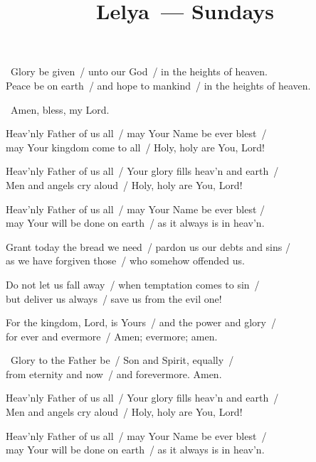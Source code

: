 \documentclass[12pt,twoside,a5paper]{article}
\begin{document}
\title{Lelya~--- Sundays}
\author{}
\date{}
\maketitle


\begin{halfparskip}

  \cc~Glory be given~/ unto our God~/ in the heights of heaven.\\
  Peace be on earth~/ and hope to mankind~/ in the heights of heaven.

  \rr~Amen, bless, my Lord. 

  Heav'nly Father of us all~/ may Your Name be ever blest~/ \\
  may Your kingdom come to all~/ Holy, holy are You, Lord!

  Heav'nly Father of us all~/ Your glory fills heav'n and earth~/ \\
  Men and angels cry aloud~/ Holy, holy are You, Lord!

  Heav'nly Father of us all~/ may Your Name be ever blest /\\
  may Your will be done on earth~/ as it always is in heav'n.

  Grant today the bread we need~/ pardon us our debts and sins /\\
  as we have forgiven those~/ who somehow offended us.

  Do not let us fall away~/ when temptation comes to sin~/ \\
  but deliver us always~/ save us from the evil one!

  For the kingdom, Lord, is Yours~/ and the power and glory~/ \\
  for ever and evermore~/ Amen; evermore; amen.

  \cc~Glory to the Father be~/ Son and Spirit, equally~/ \\
  from eternity and now~/ and forevermore. Amen.

  Heav'nly Father of us all~/ Your glory fills heav'n and earth~/ \\
  Men and angels cry aloud~/ Holy, holy are You, Lord!

  Heav'nly Father of us all~/ may Your Name be ever blest~/ \\
  may Your will be done on earth~/ as it always is in heav'n.
\end{halfparskip}
\end{document}
